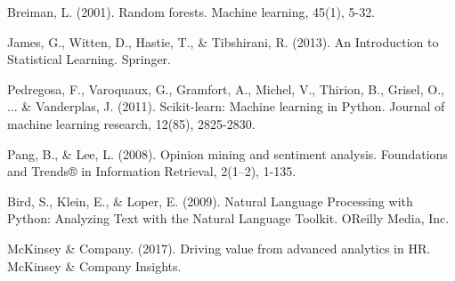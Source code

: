 \documentclass[
]{article}
\begin{document}
Breiman, L. (2001). Random forests. Machine learning, 45(1), 5-32.

James, G., Witten, D., Hastie, T., \& Tibshirani, R. (2013). An
Introduction to Statistical Learning. Springer.

Pedregosa, F., Varoquaux, G., Gramfort, A., Michel, V., Thirion, B.,
Grisel, O., ... \& Vanderplas, J. (2011). Scikit-learn: Machine learning
in Python. Journal of machine learning research, 12(85), 2825-2830.

Pang, B., \& Lee, L. (2008). Opinion mining and sentiment analysis.
Foundations and Trends® in Information Retrieval, 2(1--2), 1-135.

Bird, S., Klein, E., \& Loper, E. (2009). Natural Language Processing
with Python: Analyzing Text with the Natural Language Toolkit.
O\textquotesingle Reilly Media, Inc.

McKinsey \& Company. (2017). Driving value from advanced analytics in
HR. McKinsey \& Company Insights.
\end{document}
